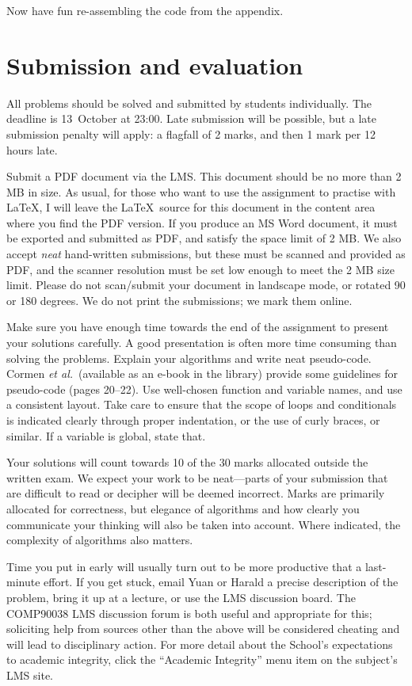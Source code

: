 \documentclass[11pt]{article}
\begin{document}
\vspace{1ex}\noindent
Now have fun re-assembling the code from the appendix.
\hfill

\section*{Submission and evaluation}
All problems should be solved and submitted by students individually.
The deadline is 13~October at 23:00.
Late submission will be possible, but a late submission penalty will
apply: a flagfall of 2 marks, and then 1 mark per 12 hours late.

Submit a PDF document via the LMS.
This document should be no more than 2 MB in size.
As usual, for those who want to use the assignment to practise with 
\LaTeX, I will leave the \LaTeX\ source for this document in the
content area where you find the PDF version.
If you produce an MS Word document, it must be exported
and submitted as PDF, and satisfy the space limit of 2 MB.
We also accept \emph{neat} hand-written submissions, but these must be
scanned and provided as PDF, and the scanner resolution must be set low
enough to meet the 2 MB size limit.
Please do not scan/submit your document in landscape mode, or rotated
90 or 180 degrees.
We do not print the submissions; we mark them online.

Make sure you have enough time towards the end of the assignment
to present your solutions carefully.
A good presentation is often more time consuming than solving
the problems.
Explain your algorithms and write neat pseudo-code.
Cormen \emph{et al.}\ (available as an e-book in the library)
provide some guidelines for pseudo-code (pages 20--22).
Use well-chosen function and variable names, and use a consistent layout.
Take care to ensure that the scope of loops and conditionals is
indicated clearly through proper indentation, or the use of 
curly braces, or similar.
If a variable is global, state that.

Your solutions will count towards 10 of the 30 marks allocated outside the
written exam.
We expect your work to be neat---parts of your submission
that are difficult to read or decipher will be deemed incorrect.
Marks are primarily allocated for correctness, but elegance of
algorithms and how clearly you communicate your thinking will 
also be taken into account.
Where indicated, the complexity of algorithms also matters.

Time you put in early will usually turn out to be more productive that
a last-minute effort.
If you get stuck, email Yuan or Harald a precise description of the
problem, bring it up at a lecture, or use the LMS discussion board.
The COMP90038 LMS discussion forum is both useful and appropriate
for this; soliciting help from sources other than the above
will be considered cheating and will lead to disciplinary action.
For more detail about the School's expectations to academic integrity,
click the ``Academic Integrity'' menu item on the subject's LMS site.
\end{document}
